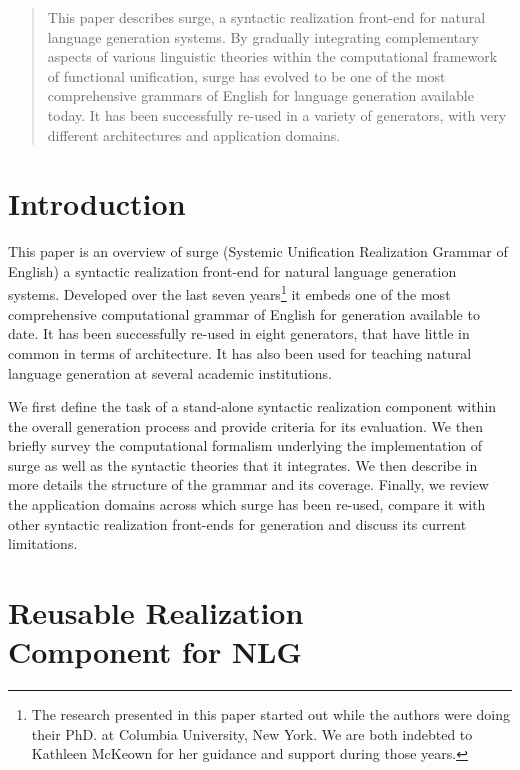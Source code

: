 \date{}
\maketitle

\begin{abstract}
  This paper describes {\sc surge}, a syntactic realization front-end for
  natural language generation systems.  By gradually integrating
  complementary aspects of various linguistic theories within the
  computational framework of functional unification, {\sc surge} has
  evolved to be one of the most comprehensive grammars of English for
  language generation available today. It has been successfully re-used in
  a variety of generators, with very different architectures and
  application domains.
\end{abstract}

\section{Introduction} 

This paper is an overview of {\sc surge} (Systemic Unification Realization
Grammar of English) a syntactic realization front-end for natural language
generation systems. Developed over the last seven years\footnote{The research
presented in this paper started out while the authors were doing their PhD. at
Columbia University, New York. We are both indebted to Kathleen McKeown for her
guidance and support during those years.} it embeds one of the most
comprehensive computational grammar of English for generation available to
date. It has been successfully re-used in eight generators, that have little in
common in terms of architecture.  It has also been used for teaching natural
language generation at several academic institutions.

We first define the task of a stand-alone syntactic realization component
within the overall generation process and provide criteria for its
evaluation.  We then briefly survey the computational formalism underlying
the implementation of {\sc surge} as well as the syntactic theories that it
integrates.  We then describe in more details the structure of the grammar
and its coverage. Finally, we review the application domains across which
{\sc surge} has been re-used, compare it with other syntactic realization
front-ends for generation and discuss its current limitations.

\section[Reusable Realization Component for NLG]{Reusable
Realization\\Component for NLG} 

